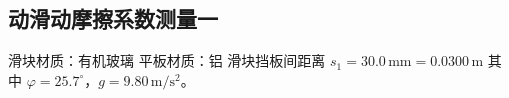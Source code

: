 

\subsection{动滑动摩擦系数测量一}

滑块材质：有机玻璃
平板材质：铝
滑块挡板间距离 $s_1=30.0\,\mathrm{mm}=0.0300\,\mathrm{m}$
其中 $\varphi=25.7^\circ$，$g=9.80\,\mathrm{m/s^2}$。

